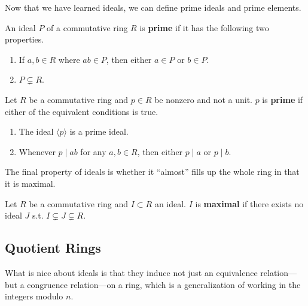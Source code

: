   Now that we have learned ideals, we can define prime ideals and prime elements. 
  
  \begin{definition}
    An ideal $P$ of a commutative ring $R$ is \textbf{prime} if it has the following two properties. 
    \begin{enumerate}
      \item If $a, b \in R$ where $ab \in P$, then either $a \in P$ or $b \in P$. 
      \item $P \subsetneq R$. 
    \end{enumerate}
  \end{definition}

  \begin{definition}
    Let $R$ be a commutative ring and $p \in R$ be nonzero and not a unit. $p$ is \textbf{prime} if either of the equivalent conditions is true. 
    \begin{enumerate}
      \item The ideal $\langle p \rangle$ is a prime ideal. 
      \item Whenever $p \mid ab$ for any $a, b \in R$, then either $p \mid a$ or $p \mid b$. 
    \end{enumerate}
  \end{definition}

  The final property of ideals is whether it ``almost'' fills up the whole ring in that it is maximal. 

  \begin{definition}
    Let $R$ be a commutative ring and $I \subset R$ an ideal. $I$ is \textbf{maximal} if there exists no ideal $J$ s.t. $I \subsetneq J \subsetneq R$. 
  \end{definition}

\subsection{Quotient Rings}

  What is nice about ideals is that they induce not just an equivalence relation---but a congruence relation---on a ring, which is a generalization of working in the integers modulo $n$. 

